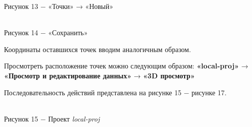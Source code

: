 \documentclass[a4paper]{article}
\begin{document}
{\begin{center}
    Рисунок 13 $-$ «Точки» → «Новый» 
\end{center}
\begin{center}
    \\
    Рисунок 14 $-$ «Сохранить»  
\end{center}
\par Координаты оставшихся точек вводим аналогичным образом.
\par Просмотреть расположение точек можно следующим образом: \textbf{«local-proj»} → \textbf{«Просмотр и редактирование данных»} → \textbf{«3D просмотр»} 
\par Последовательность действий представлена на рисунке 15 $-$ рисунке 17.
\begin{center}
    \\
    Рисунок 15 $-$ Проект \textit{local-proj}  
\end{center}
\begin{center}
     \\

\end{center}}
\end{document}
